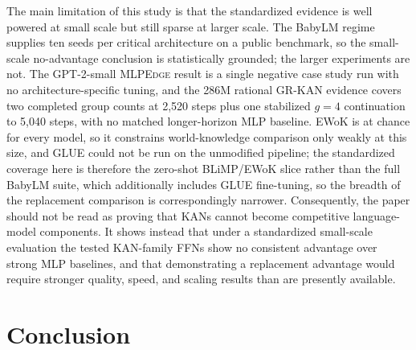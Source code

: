 \documentclass{article}
\newcommand{\modelname}[1]{\textsc{#1}}
\newcommand{\grkan}{\modelname{GR-KAN}}
\newcommand{\mlpedge}{\modelname{MLPEdge}}
\begin{document}
The main limitation of this study is that the standardized evidence is well powered at small scale but still sparse at larger scale. The BabyLM regime supplies ten seeds per critical architecture on a public benchmark, so the small-scale no-advantage conclusion is statistically grounded; the larger experiments are not. The GPT-2-small \mlpedge{} result is a single negative case study run with no architecture-specific tuning, and the 286M rational \grkan{} evidence covers two completed group counts at 2,520 steps plus one stabilized \(g=4\) continuation to 5,040 steps, with no matched longer-horizon MLP baseline. EWoK is at chance for every model, so it constrains world-knowledge comparison only weakly at this size, and GLUE could not be run on the unmodified pipeline; the standardized coverage here is therefore the zero-shot BLiMP/EWoK slice rather than the full BabyLM suite, which additionally includes GLUE fine-tuning, so the breadth of the replacement comparison is correspondingly narrower. Consequently, the paper should not be read as proving that KANs cannot become competitive language-model components. It shows instead that under a standardized small-scale evaluation the tested KAN-family FFNs show no consistent advantage over strong MLP baselines, and that demonstrating a replacement advantage would require stronger quality, speed, and scaling results than are presently available.

\section{Conclusion}
\end{document}
